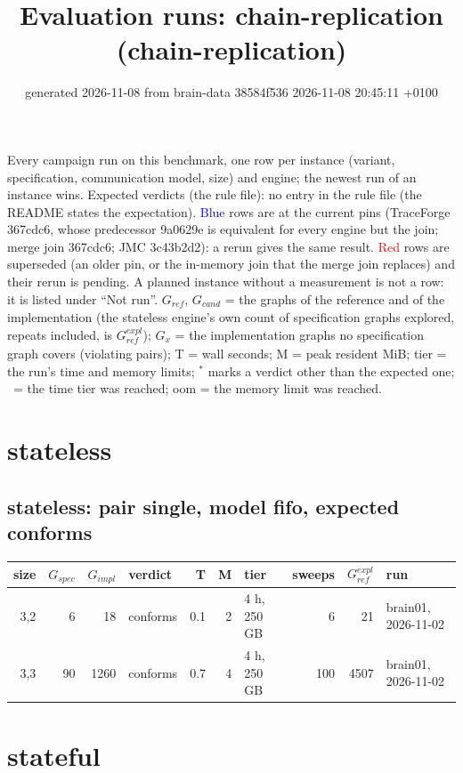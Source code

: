 \documentclass[10pt]{article}
\title{Evaluation runs: \textsf{chain-replication} (chain-replication)}
\author{}
\date{generated 2026-11-08 from brain-data 38584f536 2026-11-08 20:45:11 +0100}
\begin{document}
\maketitle\small
\noindent Every campaign run on this benchmark, one row per instance (variant, specification, communication model, size) and engine; the newest run of an instance wins. Expected verdicts (the rule file): no entry in the rule file (the README states the expectation). \textcolor{blue}{Blue} rows are at the current pins (TraceForge 367cdc6, whose predecessor 9a0629e is equivalent for every engine but the join; merge join 367cdc6; JMC 3c43b2d2): a rerun gives the same result. \textcolor{red}{Red} rows are superseded (an older pin, or the in-memory join that the merge join replaces) and their rerun is pending. A planned instance without a measurement is not a row: it is listed under ``Not run''. $G_{\mathit{ref}}$, $G_{\mathit{cand}}$ = the graphs of the reference and of the implementation (the stateless engine's own count of specification graphs explored, repeats included, is $G_{\mathit{ref}}^{\mathit{expl}}$); $G_x$ = the implementation graphs no specification graph covers (violating pairs); T = wall seconds; M = peak resident MiB; tier = the run's time and memory limits; $^{\ast}$ marks a verdict other than the expected one; \faClock\ = the time tier was reached; oom = the memory limit was reached.

\section*{stateless}
\subsection*{stateless: pair \textsf{single}, model fifo, expected conforms}
\begin{longtable}{@{}rrrlrrlrrl@{}}
\toprule
size & $G_{\mathit{spec}}$ & $G_{\mathit{impl}}$ & verdict & T & M & tier & sweeps & $G_{\mathit{ref}}^{\mathit{expl}}$ & run \\
\midrule
\endhead
\color{blue} 3,2 & 6 & 18 & conforms & 0.1 & 2 & 4 h, 250 GB & 6 & 21 & brain01, 2026-11-02 \\
\color{blue} 3,3 & 90 & 1260 & conforms & 0.7 & 4 & 4 h, 250 GB & 100 & 4507 & brain01, 2026-11-02 \\
\bottomrule
\end{longtable}
\section*{stateful}
\end{document}
